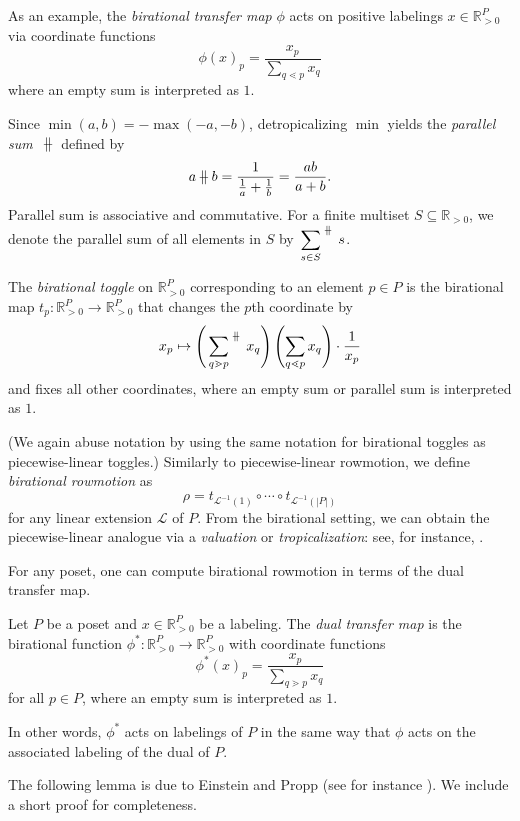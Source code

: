 \documentclass[11pt]{article}
\theoremstyle{definition}
\numberwithin{equation}{section}
\numberwithin{equation}{section}
\newcommand{\parallelsum}{\:\ \mathclap{\|}\mathclap{-}\ \:}
\begin{document}
As an example, the \emph{birational transfer map} $\phi$ acts on positive labelings $x \in \mathbb R^P_{>0}$ via coordinate functions
\[\phi(x)_p = \frac{x_p}{\sum\limits_{q \lessdot p} x_q}\]
where an empty sum is interpreted as $1$.

Since $\min(a,b) = -\max(-a,-b)$, detropicalizing $\min$ yields the \textit{parallel sum}~$\parallelsum$ defined by
\[a \parallelsum b = \frac{1}{\frac{1}{a} + \frac{1}{b}} = \frac{ab}{a+b}.\]
Parallel sum is associative and commutative. For a finite multiset $S \subseteq \mathbb{R}_{>0}$, we denote the parallel sum of all elements in $S$ by $\sideset{}{^{\parallelsum}} \sum\limits_{s \in S} s$.


\begin{Def}
The \textit{birational toggle} on $\mathbb{R}^{P}_{>0}$ corresponding to an element $p \in P$ is the birational map $t_p\colon \mathbb{R}^{P}_{>0} \to \mathbb{R}^{P}_{>0}$ that changes the $p$th coordinate by
\[x_p \mapsto \left( \sideset{}{^{\parallelsum}} \sum\limits_{q \gtrdot p} x_q \right) \left( \sum\limits_{q \lessdot p} x_q \right) \cdot \frac{1}{x_p}\]
and fixes all other coordinates, where an empty sum or parallel sum is interpreted as $1$.
\end{Def}
(We again abuse notation by using the same notation for birational toggles as piecewise-linear toggles.) Similarly to piecewise-linear rowmotion, we define \textit{birational rowmotion} as
\[\rho = t_{\mathcal{L}^{-1}(1)} \circ \cdots \circ t_{\mathcal{L}^{-1}(|P|)}\]
for any linear extension $\mathcal{L}$ of $P$. From the birational setting, we can obtain the piecewise-linear analogue via a \textit{valuation} or \emph{tropicalization}: see, for instance, \cite{einsteinpropp2,einsteinpropp1}. 

For any poset, one can compute birational rowmotion in terms of the dual transfer map.

\begin{Def}
Let $P$ be a poset and $x \in \mathbb{R}_{>0}^{P}$ be a labeling. The \emph{dual transfer map} is the birational function $\phi^*\colon\mathbb{R}_{>0}^{P} \to \mathbb{R}_{>0}^{P}$ with coordinate functions
\[\phi^*(x)_p = \frac{x_p}{\sum\limits_{q \gtrdot p} x_q}\]
for all $p \in P$, where an empty sum is interpreted as $1$.
\end{Def}

In other words, $\phi^*$ acts on labelings of $P$ in the same way that $\phi$ acts on the associated labeling of the dual of $P$. 

The following lemma is due to Einstein and Propp (see for instance \cite{einsteinpropp2,josephroby2}). We include a short proof for completeness.
\end{document}
